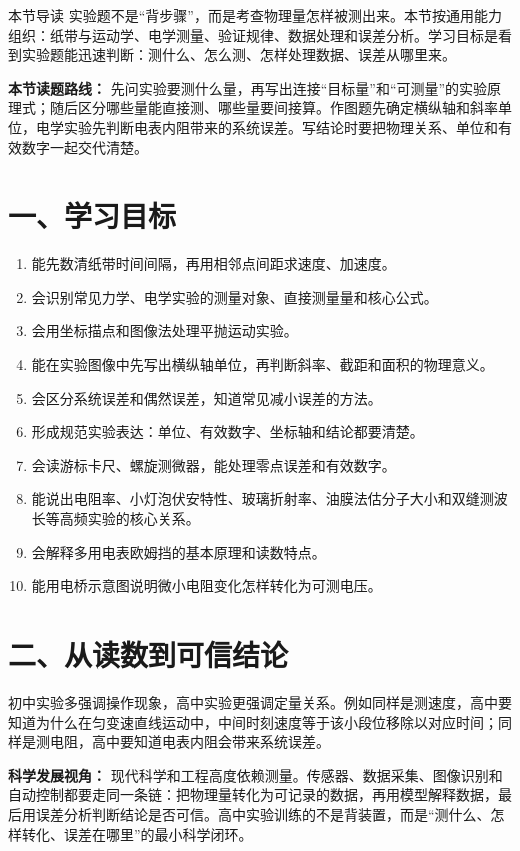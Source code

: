 
\begin{learningbox}{本节导读}
实验题不是“背步骤”，而是考查物理量怎样被测出来。本节按通用能力组织：纸带与运动学、电学测量、验证规律、数据处理和误差分析。学习目标是看到实验题能迅速判断：测什么、怎么测、怎样处理数据、误差从哪里来。
\end{learningbox}

\textbf{本节读题路线：} 先问实验要测什么量，再写出连接“目标量”和“可测量”的实验原理式；随后区分哪些量能直接测、哪些量要间接算。作图题先确定横纵轴和斜率单位，电学实验先判断电表内阻带来的系统误差。写结论时要把物理关系、单位和有效数字一起交代清楚。

\section*{一、学习目标}
\begin{enumerate}
  \item 能先数清纸带时间间隔，再用相邻点间距求速度、加速度。
  \item 会识别常见力学、电学实验的测量对象、直接测量量和核心公式。
  \item 会用坐标描点和图像法处理平抛运动实验。
  \item 能在实验图像中先写出横纵轴单位，再判断斜率、截距和面积的物理意义。
  \item 会区分系统误差和偶然误差，知道常见减小误差的方法。
  \item 形成规范实验表达：单位、有效数字、坐标轴和结论都要清楚。
  \item 会读游标卡尺、螺旋测微器，能处理零点误差和有效数字。
  \item 能说出电阻率、小灯泡伏安特性、玻璃折射率、油膜法估分子大小和双缝测波长等高频实验的核心关系。
  \item 会解释多用电表欧姆挡的基本原理和读数特点。
  \item 能用电桥示意图说明微小电阻变化怎样转化为可测电压。
\end{enumerate}
\section*{二、从读数到可信结论}

初中实验多强调操作现象，高中实验更强调定量关系。例如同样是测速度，高中要知道为什么在匀变速直线运动中，中间时刻速度等于该小段位移除以对应时间；同样是测电阻，高中要知道电表内阻会带来系统误差。

\textbf{科学发展视角：} 现代科学和工程高度依赖测量。传感器、数据采集、图像识别和自动控制都要走同一条链：把物理量转化为可记录的数据，再用模型解释数据，最后用误差分析判断结论是否可信。高中实验训练的不是背装置，而是“测什么、怎样转化、误差在哪里”的最小科学闭环。

